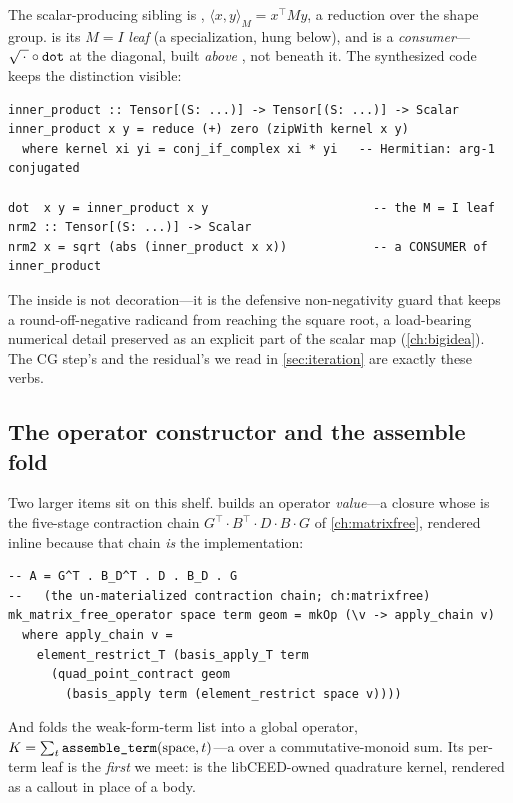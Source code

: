 The scalar-producing sibling is , $\langle x, y\rangle_M =
x^{\!\top} M y$, a reduction over the shape group.  is its
$M = I$ \emph{leaf} (a specialization, hung below), and  is a
\emph{consumer}---$\sqrt{\,\cdot\,}\circ\texttt{dot}$ at the diagonal, built
\emph{above} , not beneath it. The synthesized code keeps the distinction
visible:

\begin{lstlisting}[style=l4style]
inner_product :: Tensor[(S: ...)] -> Tensor[(S: ...)] -> Scalar
inner_product x y = reduce (+) zero (zipWith kernel x y)
  where kernel xi yi = conj_if_complex xi * yi   -- Hermitian: arg-1 conjugated

dot  x y = inner_product x y                       -- the M = I leaf
nrm2 :: Tensor[(S: ...)] -> Scalar
nrm2 x = sqrt (abs (inner_product x x))            -- a CONSUMER of inner_product
\end{lstlisting}
The  inside  is not decoration---it is the defensive
non-negativity guard that keeps a round-off-negative radicand from reaching the
square root, a load-bearing numerical detail preserved as an explicit part of the
scalar map (\cref{ch:bigidea}). The CG step's  and the residual's
 we read in \cref{sec:iteration} are exactly these verbs.

\subsection{The operator constructor and the assemble fold}

Two larger items sit on this shelf.  builds an
operator \emph{value}---a closure whose  is the five-stage contraction
chain $G^{\!\top}\!\cdot B^{\!\top}\!\cdot D \cdot B \cdot G$ of \cref{ch:matrixfree},
rendered inline because that chain \emph{is} the implementation:

\begin{lstlisting}[style=l4style]
-- A = G^T . B_D^T . D . B_D . G
--   (the un-materialized contraction chain; ch:matrixfree)
mk_matrix_free_operator space term geom = mkOp (\v -> apply_chain v)
  where apply_chain v =
    element_restrict_T (basis_apply_T term
      (quad_point_contract geom
        (basis_apply term (element_restrict space v))))
\end{lstlisting}
And  folds the weak-form-term list into a global operator,
$K = \sum_t \texttt{assemble\_term}(\text{space}, t)$---a  over a
commutative-monoid sum. Its per-term leaf is the \emph{first}  we
meet:  is the libCEED-owned quadrature kernel, rendered as a
callout in place of a body.

